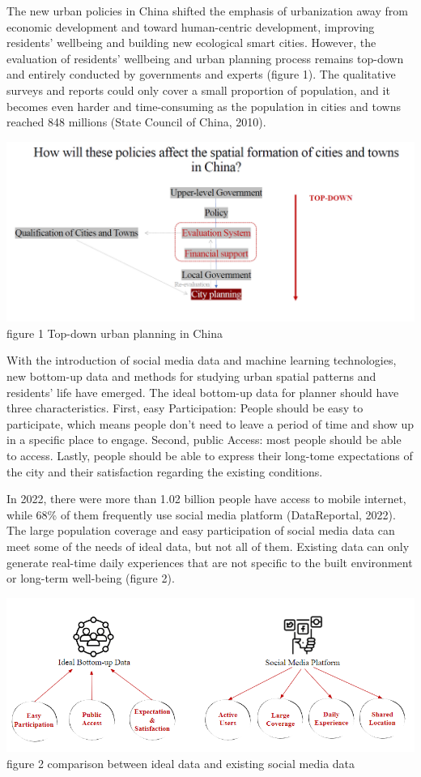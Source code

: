 \documentclass[
]{article}
\begin{document}
The new urban policies in China shifted the emphasis of urbanization
away from economic development and toward human-centric development,
improving residents' wellbeing and building new ecological smart cities.
However, the evaluation of residents' wellbeing and urban planning
process remains top-down and entirely conducted by governments and
experts (figure 1). The qualitative surveys and reports could only cover
a small proportion of population, and it becomes even harder and
time-consuming as the population in cities and towns reached 848
millions (State Council of China, 2010).

\href{https://WTHSYZW.github.io/Thesis_2022/maps/topdown.pdf}{\includegraphics{maps/topdown.png}}\\
figure 1 Top-down urban planning in China

With the introduction of social media data and machine learning
technologies, new bottom-up data and methods for studying urban spatial
patterns and residents' life have emerged. The ideal bottom-up data for
planner should have three characteristics. First, easy Participation:
People should be easy to participate, which means people don't need to
leave a period of time and show up in a specific place to engage.
Second, public Access: most people should be able to access. Lastly,
people should be able to express their long-tome expectations of the
city and their satisfaction regarding the existing conditions.

In 2022, there were more than 1.02 billion people have access to mobile
internet, while 68\% of them frequently use social media platform
(DataReportal, 2022). The large population coverage and easy
participation of social media data can meet some of the needs of ideal
data, but not all of them. Existing data can only generate real-time
daily experiences that are not specific to the built environment or
long-term well-being (figure 2).

\href{https://WTHSYZW.github.io/Thesis_2022/maps/comparison.png}{\includegraphics{maps/comparison.png}}
figure 2 comparison between ideal data and existing social media data
\end{document}
